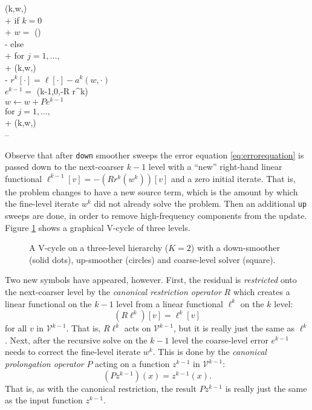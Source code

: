 \documentclass[letterpaper,final,12pt,reqno]{amsart}
\begin{document}
\begin{pseudo*}
(k,w,\ell)\text{:} \\+
    if $k=0$ \\+
        $w =$ (\ell) \\-  %
    else \\+
        for $j=1,\dots,$ \\+
            (k,w,\ell) \\-
        $r^k[\cdot] = \ell[\cdot] - a^k(w,\cdot)$ \\
        $e^{k-1} =$ (k-1,0,-R r^k) \\
        $w \gets w + P e^{k-1}$ \\
        for $j=1,\dots,$ \\+
            (k,w,\ell) \\--
\end{pseudo*}

Observe that after \texttt{down} smoother sweeps the error equation \eqref{eq:errorequation} is passed down to the next-coarser $k-1$ level with a ``new'' right-hand linear functional $\ell^{k-1}[v]=-(R r^k(w^k))[v]$ and a zero initial iterate.  That is, the problem changes to have a new source term, which is the amount by which the fine-level iterate $w^k$ did not already solve the problem.  Then an additional \texttt{up} sweeps are done, in order to remove high-frequency components from the update.  Figure \ref{fig:vcycle} shows a graphical V-cycle of three levels.

\begin{figure}

\caption{A V-cycle on a three-level hierarchy ($K=2$) with a down-smoother (solid dots), up-smoother (circles) and coarse-level solver (square).}
\label{fig:vcycle}
\end{figure}

Two new symbols have appeared, however.  First, the residual is \emph{restricted} onto the next-coarser level by the \emph{canonical restriction operator} $R$ which creates a linear functional on the $k-1$ level from a linear functional $\ell^k$ on the $k$ level:
\begin{equation}
  (R \ell^k)[v] = \ell^k[v] \label{eq:canonicalrestriction}
\end{equation}
for all $v$ in $\mathcal{V}^{k-1}$.  That is, $R \ell^k$ acts on $\mathcal{V}^{k-1}$, but it is really just the same as $\ell^k$.  Next, after the recursive solve on the $k-1$ level the coarse-level error $e^{k-1}$ needs to correct the fine-level iterate $w^k$.  This is done by the \emph{canonical prolongation operator} $P$ acting on a function $z^{k-1}$ in $\mathcal{V}^{k-1}$:
\begin{equation}
  (P z^{k-1})(x) = z^{k-1}(x). \label{eq:canonicalprolongation}
\end{equation}
That is, as with the canonical restriction, the result $P z^{k-1}$ is really just the same as the input function $z^{k-1}$.
\end{document}
